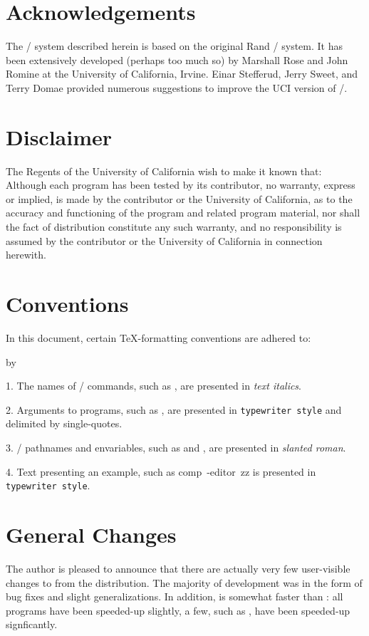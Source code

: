 \banner
\section{Acknowledgements}
The \MH/ system described herein is based on the original Rand \MH/ system.
It has been extensively developed (perhaps too much so) by Marshall Rose and
John Romine at the University of California, Irvine.
Einar Stefferud, Jerry Sweet, and Terry Domae provided numerous suggestions
to improve the UCI version of \MH/.

\section{Disclaimer}
The Regents of the University of California wish to make it known that:
\bigquote
Although each program has been tested by its contributor,
no warranty, express or implied,
is made by the contributor or the University of California,
as to the accuracy and functioning of the program
and related program material,
nor shall the fact of distribution constitute any such warranty,
and no responsibility is assumed by the contributor
or the University of California in connection herewith.
\endbigquote

\section{Conventions}
In this document,
certain \TeX -formatting conventions are adhered to:
\smallskip
{\advance\leftskip by\parindent
\item{1.} The names of \unix/ commands, such as ,
are presented in {\it text italics}.
\item{2.} Arguments to programs, such as ,
are presented in {\tt typewriter style} and delimited by single-quotes.
\item{3.} \unix/ pathnames and envariables,
such as  and ,
are presented in {\sl slanted roman}.
\item{4.} Text presenting an example, such as
\example comp\ -editor\ zz\endexample
is presented in {\tt typewriter style}.
\smallskip}

\bop\section{General Changes}
The author is pleased to announce that there are actually very few
user-visible changes to  from the  distribution.
The majority of  development was in the form of bug fixes and slight
generalizations.
In addition,  is somewhat faster than :
all programs have been speeded-up slightly,
a few, such as , have been speeded-up signficantly.

